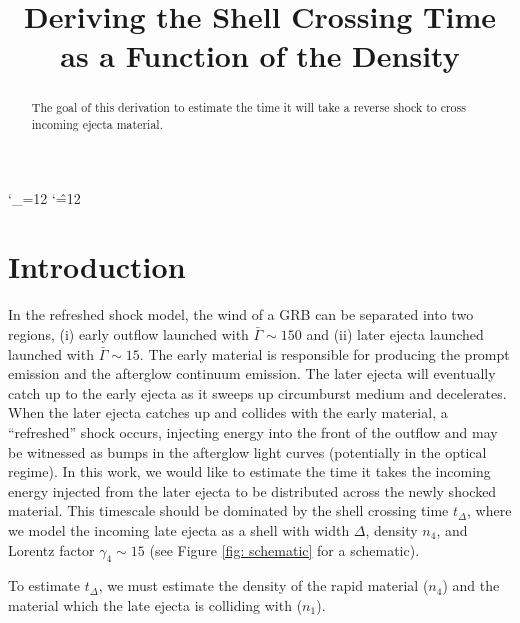 \documentclass[linenumbers,twocolumn]{aastex631}
\def\upsubscripts{\catcode`\_=12 } \def\normalsubscripts{\catcode`\_=8 }
\def\upsupscripts{\catcode`\^=12 } \def\normalsupscripts{\catcode`\^=7 }
\begin{document}
\upsubscripts
\upsupscripts

\title{Deriving the Shell Crossing Time as a Function of the Density}


\begin{abstract}
The goal of this derivation to estimate the time it will take a reverse shock to cross incoming ejecta material.

\end{abstract}

\section{Introduction}
{
    In the refreshed shock model, the wind of a GRB can be separated into two regions, (i) early outflow launched with $\bar{\Gamma}\sim150$ and (ii) later ejecta launched launched with $\bar{\Gamma}\sim15$. The early material is responsible for producing the prompt emission and the afterglow continuum emission. The later ejecta will eventually catch up to the early ejecta as it sweeps up circumburst medium and decelerates. When the later ejecta catches up and collides with the early material, a ``refreshed'' shock occurs, injecting energy into the front of the outflow and may be witnessed as bumps in the afterglow light curves (potentially in the optical regime). In this work, we would like to estimate the time it takes the incoming energy injected from the later ejecta to be distributed across the newly shocked material. This timescale should be dominated by the shell crossing time $t_{\Delta }$, where we model the incoming late ejecta as a shell with width $\Delta$, density $n_4$, and Lorentz factor $\gamma_{4}\sim15$ (see Figure \ref{fig: schematic} for a schematic). 

    To estimate $t_{\Delta}$, we must estimate the density of the rapid material ($n_4$) and the material which the late ejecta is colliding with ($n_1$).
}
\end{document}
